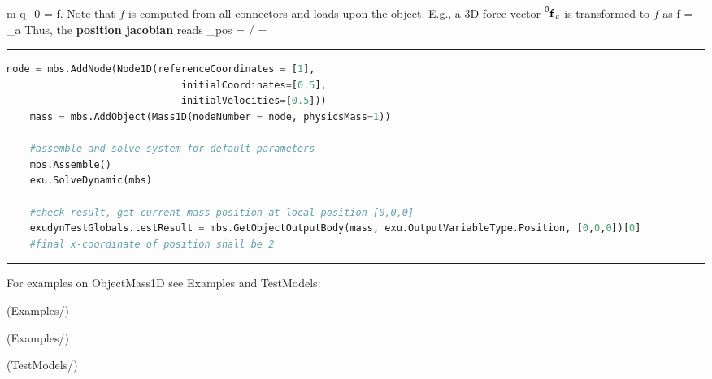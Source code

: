     \be 
      m \cdot \ddot q_0 = f.
    \ee
    Note that $f$ is computed from all connectors and loads upon the object. E.g., a 3D force vector $\prescript{0}{}{\mathbf{f}}\,_a$ is 
    transformed to $f$ as
    \be
      f =   _a
    \ee
    Thus, the {\bf position jacobian} reads 
    \be
      \Jm_{pos} = \partial \pv\cCur / \cCur = 
        
    \ee
\vspace{6pt}\par\noindent\rule{\textwidth}{0.4pt}
\label{miniExample_ObjectMass1D}
\pythonstyle
\begin{lstlisting}[language=Python, firstnumber=1]
    node = mbs.AddNode(Node1D(referenceCoordinates = [1], 
                              initialCoordinates=[0.5],
                              initialVelocities=[0.5]))
    mass = mbs.AddObject(Mass1D(nodeNumber = node, physicsMass=1))

    #assemble and solve system for default parameters
    mbs.Assemble()
    exu.SolveDynamic(mbs)

    #check result, get current mass position at local position [0,0,0]
    exudynTestGlobals.testResult = mbs.GetObjectOutputBody(mass, exu.OutputVariableType.Position, [0,0,0])[0]
    #final x-coordinate of position shall be 2

\end{lstlisting}

\vspace{6pt}\par\noindent\rule{\textwidth}{0.4pt}
%
\noindent For examples on ObjectMass1D see Examples and TestModels:
\bi
\item {} (Examples/)
\item {} (Examples/)
\item {} (TestModels/)
\ei

%
\newpage

